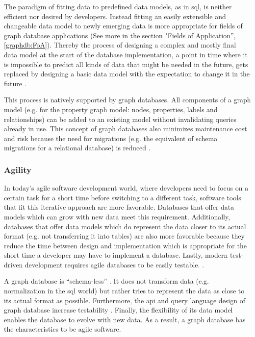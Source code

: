The paradigm of fitting data to predefined data models, as in \gls{sql}, is neither efficient nor desired by developers. Instead fitting an easily extensible and changeable data model to newly emerging data is more appropriate for fields of graph database applications (See more in the section "Fields of Application”, \ref{graphdb:FoA}). Thereby the process of designing a complex and mostly final data model at the start of the database implementation, a point in time where it is impossible to predict all kinds of data that might be needed in the future, gets replaced by designing a basic data model with the expectation to change it in the future \autocite{maheshlal2015, graphdb2015}.

This process is natively supported by graph databases. All components of a graph model (e.g. for the property graph model: nodes, properties, labels and relationships) can be added to an existing model without invalidating queries already in use. This concept of graph databases also minimizes maintenance cost and risk because the need for migrations (e.g. the equivalent of schema migrations for a relational database) is reduced \autocite{maheshlal2015, graphdb2015}.

\subsubsection{Agility}
In today's agile software development world, where developers need to focus on a certain task for a short time before switching to a different task, software tools that fit this iterative approach are more favorable. Databases that offer data models which can grow with new data meet this requirement. Additionally, databases that offer data models which do represent the data closer to its actual format (e.g. not transferring it into tables) are also more favorable because they reduce the time between design and implementation which is appropriate for the short time a developer may have to implement a database. Lastly, modern test-driven development requires agile databases to be easily testable. \autocite{maheshlal2015, graphdb2015}.

A graph database is “schema-less” \autocite{maheshlal2015}. It does not transform data (e.g. normalization in the \gls{sql} world) but rather tries to represent the data as close to its actual format as possible. Furthermore, the \gls{api} and query language design of graph database increase testability \autocite{graphdb2015} . Finally, the flexibility of its data model enables the database to evolve with new data. As a result, a graph database has the characteristics to be agile software.

